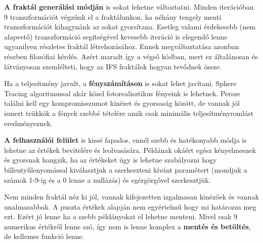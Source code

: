 \textbf{A fraktál generálási módján} is sokat lehetne változtatni. Minden iterációban 9 transzformációt végzünk el a fraktálunkon, ha néhány tengely menti transzformációt kihagynánk az sokat gyorsítana. Esetleg valami érdekesebb (nem alapvető) transzformáció segítségével kevesebb iteráció is elegendő lenne ugyanilyen részletes fraktál létrehozásához. Ennek megváltoztatása azonban részben filozófiai kérdés. Azért maradt így a végső kódban, mert ez általánosan és látványosan szemlélteti, hogy az IFS fraktálok hogyan tevődnek össze.

Ha a teljesítmény javult, a \textbf{fényszámításon} is sokat lehet javítani. Sphere Tracing algoritmussal akár közel fotorealisztikus fényeink is lehetnek. Persze találni kell egy kompromisszumot kinézet és gyorsaság között, de vannak jól ismert trükkök a fények szebbé tételére amik csak minimális teljesítményromlást eredményeznek.

\textbf{A felhasználói felület} is kissé fapados, ennél szebb és hatékonyabb módja is lehetne az értékek bevitelére és leolvasására. Példának okáért egész kényelmesnek és gyorsnak hangzik, ha az értékeket úgy is lehetne szabályozni hogy billentyűlenyomással kiválasztjuk a szerkeszteni kívánt paramétert (mondjuk a számok 1-9-ig és a 0 lenne a nullázás) és egérgörgővel szerkesztjük.

Nem minden fraktál néz ki jól, vannak kifejezetten izgalmasan kinézőek és vannak unalmasabbak. A puszta értékek alapján nem egyértelmű hogy mi határozza meg ezt. Ezért jó lenne ha a szebb példányokat el lehetne menteni. Mivel csak 9 numerikus értékről lenne szó, így nem is lenne komplex a \textbf{mentés és betöltés}, de kellemes funkció lenne.